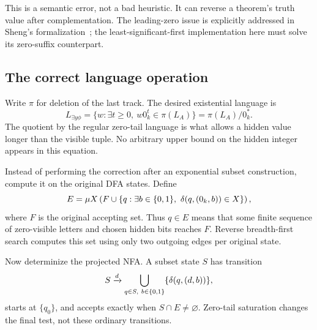 This is a semantic error, not a bad heuristic. It can reverse a theorem's truth value after complementation. The leading-zero issue is explicitly addressed in Sheng's formalization~\cite{sheng,aeacu-projection}; the least-significant-first implementation here must solve its zero-suffix counterpart.

\subsection{The correct language operation}
Write \(\pi\) for deletion of the last track. The desired existential language is
\begin{equation}\label{eq:projection-language}
 L_{\exists y\phi}
 =\{w:\exists t\ge0,\ w0_k^t\in\pi(L_A)\}
 =\pi(L_A)/0_k^*.
\end{equation}
The quotient by the regular zero-tail language is what allows a hidden value longer than the visible tuple. No arbitrary upper bound on the hidden integer appears in this equation.

Instead of performing the correction after an exponential subset construction, compute it on the original DFA states. Define
\begin{equation}\label{eq:tail}
 E=\mu X\left(F\cup
 \{q:\exists b\in\{0,1\},\ \delta(q,(0_k,b))\in X\}\right),
\end{equation}
where \(F\) is the original accepting set. Thus \(q\in E\) means that some finite sequence of zero-visible letters and chosen hidden bits reaches \(F\). Reverse breadth-first search computes this set using only two outgoing edges per original state.

Now determinize the projected NFA. A subset state \(S\) has transition
\begin{equation}\label{eq:subset-step}
 S\xrightarrow{d}
 \bigcup_{q\in S,\ b\in\{0,1\}}\{\delta(q,(d,b))\},
\end{equation}
starts at \(\{q_0\}\), and accepts exactly when \(S\cap E\ne\varnothing\). Zero-tail saturation changes the final test, not these ordinary transitions.

